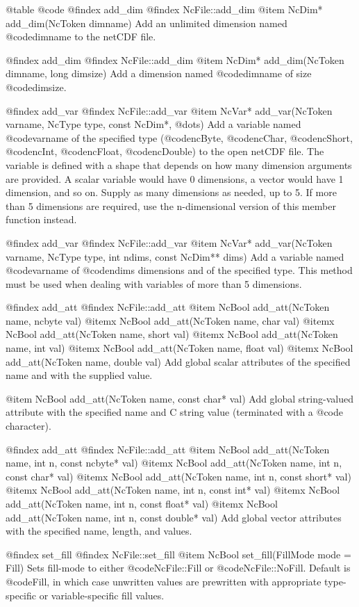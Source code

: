 @table @code
@findex add_dim
@findex NcFile::add_dim
@item NcDim* add_dim(NcToken dimname)
Add an unlimited dimension named @code{dimname} to the netCDF file.

@findex add_dim
@findex NcFile::add_dim
@item NcDim* add_dim(NcToken dimname, long dimsize)
Add a dimension named @code{dimname} of size @code{dimsize}.

@findex add_var
@findex NcFile::add_var
@item NcVar* add_var(NcToken varname, NcType type, const NcDim*, @dots{})
Add a variable named @code{varname} of the specified type
(@code{ncByte}, @code{ncChar}, @code{ncShort}, @code{ncInt},
@code{ncFloat}, @code{ncDouble}) to the open netCDF file.  The variable
is defined with a shape that depends on how many
dimension arguments are provided.  A scalar variable would have 0
dimensions, a vector would have 1 dimension, and so on.  Supply as many
dimensions as needed, up to 5.  If more than 5 dimensions are required,
use the n-dimensional version of this member function instead.

@findex add_var
@findex NcFile::add_var
@item NcVar* add_var(NcToken varname, NcType type, int ndims, const NcDim** dims)
Add a variable named @code{varname} of @code{ndims} dimensions and of
the specified type.  This method must be used when dealing with
variables of more than 5 dimensions.

@findex add_att
@findex NcFile::add_att
@item  NcBool add_att(NcToken name, ncbyte val)
@itemx NcBool add_att(NcToken name, char val)
@itemx NcBool add_att(NcToken name, short val)
@itemx NcBool add_att(NcToken name, int val)
@itemx NcBool add_att(NcToken name, float val)
@itemx NcBool add_att(NcToken name, double val)
Add global scalar attributes of the specified name and with the
supplied value.

@item NcBool add_att(NcToken name, const char* val)
Add global string-valued attribute with the specified name and C string
value (terminated with a @code{\0} character).

@findex add_att
@findex NcFile::add_att
@item  NcBool add_att(NcToken name, int n, const ncbyte* val)
@itemx NcBool add_att(NcToken name, int n, const char* val)
@itemx NcBool add_att(NcToken name, int n, const short* val)
@itemx NcBool add_att(NcToken name, int n, const int* val)
@itemx NcBool add_att(NcToken name, int n, const float* val)
@itemx NcBool add_att(NcToken name, int n, const double* val)
Add global vector attributes with the specified name, length, and values.

@findex set_fill
@findex NcFile::set_fill
@item NcBool set_fill(FillMode mode = Fill)
Sets fill-mode to either @code{NcFile::Fill} or @code{NcFile::NoFill}.
Default is @code{Fill}, in which case unwritten values are prewritten
with appropriate type-specific or variable-specific fill values.

